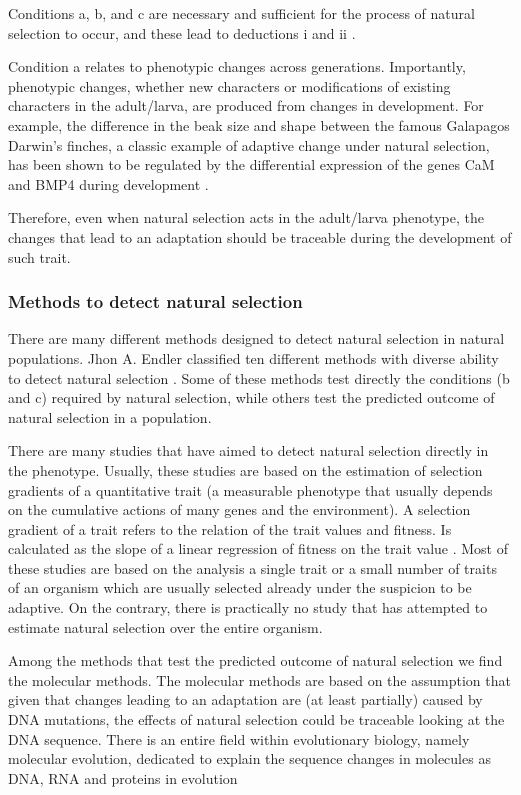 Conditions a, b, and c are necessary and sufficient for the process of natural selection to occur, and these lead to deductions i and ii \citep{endler1986natural}.

Condition a relates to phenotypic changes across generations. Importantly, phenotypic changes, whether new characters or modifications of existing characters in the adult/larva, are produced from changes in development.
For example, the difference in the beak size and shape between the famous Galapagos Darwin's finches, a classic example of adaptive change under natural selection, has been shown to be regulated by the differential expression of the genes CaM and BMP4 during development \citep{Abzhanov2006}.

Therefore, even when natural selection acts in the adult/larva phenotype, the changes that lead to an adaptation should be traceable during the development of such trait.

\subsubsection{Methods to detect natural selection}

There are many different methods designed to detect natural selection in natural populations. Jhon A. Endler classified ten different methods with diverse ability to detect natural selection \citep{endler1986natural}. Some of these methods test directly the conditions (b and c) required by natural selection, while others test the predicted outcome of natural selection in a population.

There are many studies that have aimed to detect natural selection directly in the phenotype. Usually, these studies are based on the estimation of selection gradients of a quantitative trait (a measurable phenotype that usually depends on the cumulative actions of many genes and the environment). A selection gradient of a trait refers to the relation of the trait values and fitness. Is calculated as the slope of a linear regression of fitness on the trait value \citep{barton2007evolution}.
Most of these studies are based on the analysis a single trait or a small number of traits of an organism \citep{Hoekstra2001,Hereford2004} which are usually selected already under the suspicion to be adaptive. On the contrary, there is practically no study that has attempted to estimate natural selection over the entire organism.

Among the methods that test the predicted outcome of natural selection we find the molecular methods. The molecular methods are based on the assumption that given that changes leading to an adaptation are (at least partially) caused by DNA mutations, the effects of natural selection could be traceable looking at the DNA sequence.
There is an entire field within evolutionary biology, namely molecular evolution, dedicated to explain the sequence changes in molecules as DNA, RNA and proteins in evolution

